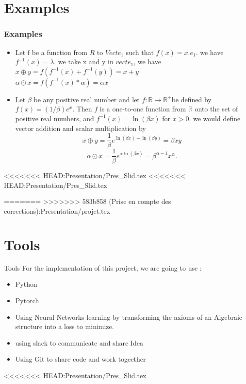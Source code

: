 \documentclass{beamer}
\begin{document}
\begin{frame}
\begin{frame}
\section{Examples}
\begin{frame}
    \frametitle{Examples}
    \begin{itemize}
        \item Let f be a function from $R$ to $Vect{e_1}$ such that $f(x) = x.e_1$.
        we have $f^{-1}(x) = \lambda$.
            we take x and y in $vect{e_1}$, we have \\
            $x\oplus y = f(f^{-1}(x) + f^{-1}(y)) = x + y$ \\
            $\alpha \odot x = f(f^{-1}(x) * \alpha) = \alpha x$
            \item Let $\beta$ be any positive real number and let $f: \mathbb{R} \rightarrow \mathbb{R}^{+}$be defined by $f(x)=(1 / \beta) e^x$. Then $f$ is a one-to-one function from $\mathbb{R}$ onto the set of positive real numbers, and $f^{-1}(x)=\ln (\beta x)$ for $x>0$. we would define vector addition and scalar multiplication by
            $$
            x \oplus y=\frac{1}{\beta} e^{\ln (\beta x)+\ln (\beta y)}=\beta x y
            $$
            $$
            \alpha \odot x=\frac{1}{\beta} e^{\alpha \ln (\beta x)}=\beta^{\alpha-1} x^\alpha.
            $$
        \end{itemize}
    \end{frame}
<<<<<<< HEAD:Presentation/Pres_Slid.tex
<<<<<<< HEAD:Presentation/Pres_Slid.tex

=======
>>>>>>> 583b858 (Prise en compte des corrections):Presentation/projet.tex
    \section{Tools}
    \begin{frame}{Tools}
        For the implementation of this project, we are going to use :
        \begin{itemize}
            \item Python
            \item Pytorch
            \item Using Neural Networks learning by transforming the axioms of
            an Algebraic structure into a loss to minimize.
            \item using slack to communicate and share Idea
            \item Using Git to share code and work togeether
        \end{itemize}
    \end{frame}
<<<<<<< HEAD:Presentation/Pres_Slid.tex

\end{frame}
\end{frame}
\end{document}
